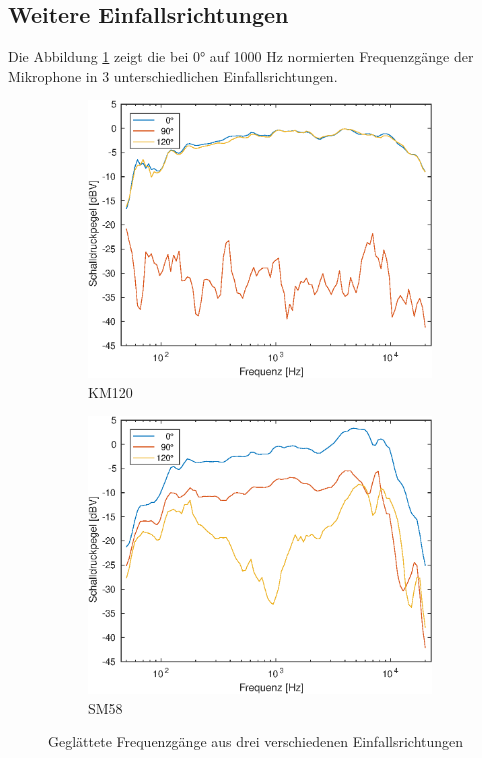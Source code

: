 \subsection{Weitere Einfallsrichtungen}

Die Abbildung \ref{fig:freq_all} zeigt die bei 0° auf 1000 Hz normierten Frequenzgänge der Mikrophone in 3 unterschiedlichen Einfallsrichtungen.

\begin{figure}[b]
    \centering
    \begin{subfigure}{.5\textwidth}
        \centering
        \caption{KM120}
        \includegraphics[width=0.95\linewidth]{Figures/km120_all}
    \end{subfigure}%
    \begin{subfigure}{.5\textwidth}
        \centering
        \caption{SM58}
        \includegraphics[width=0.95\linewidth]{Figures/sm58_all.eps}
    \end{subfigure}
    \caption{Geglättete Frequenzgänge aus drei verschiedenen Einfallsrichtungen}
    \label{fig:freq_all}
\end{figure}


